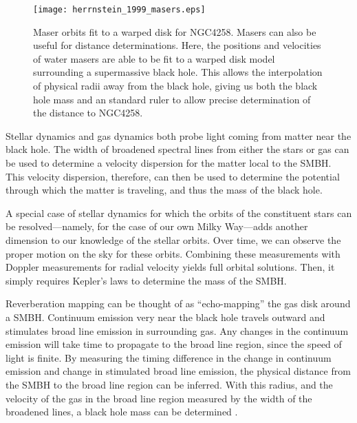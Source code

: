 \begin{figure}[H]
\centering
\texttt{[image: herrnstein\_1999\_masers.eps]}
\caption[Maser orbits fit to a warped disk for NGC4258]{\footnotesize Maser orbits fit to a warped disk for NGC4258.  Masers can also be useful for distance determinations.  Here, the positions and velocities of water masers are able to be fit to a warped disk model surrounding a supermassive black hole.  This allows the interpolation of physical radii away from the black hole, giving us both the black hole mass and an standard ruler to allow precise determination of the distance to NGC4258.  \citep{herrnstein_1999}}
\label{fig:masers}
\end{figure}

Stellar dynamics and gas dynamics both probe light coming from matter near the black hole.  The width of broadened spectral lines from either the stars or gas can be used to determine a velocity dispersion for the matter local to the SMBH.  This velocity dispersion, therefore, can then be used to determine the potential through which the matter is traveling, and thus the mass of the black hole.

A special case of stellar dynamics for which the orbits of the constituent stars can be resolved---namely, for the case of our own Milky Way---adds another dimension to our knowledge of the stellar orbits.  Over time, we can observe the proper motion on the sky for these orbits.  Combining these measurements with Doppler measurements for radial velocity yields full orbital solutions.  Then, it simply requires Kepler's laws to determine the mass of the SMBH.

Reverberation mapping can be thought of as ``echo-mapping'' the gas disk around a SMBH.  Continuum emission very near the black hole travels outward and stimulates broad line emission in surrounding gas.  Any changes in the continuum emission will take time to propagate to the broad line region, since the speed of light is finite.  By measuring the timing difference in the change in continuum emission and change in stimulated broad line emission, the physical distance from the SMBH to the broad line region can be inferred.  With this radius, and the velocity of the gas in the broad line region measured by the width of the broadened lines, a black hole mass can be determined \citep{blandford_1982}.



